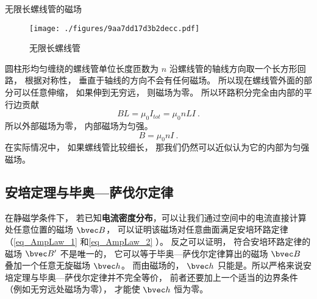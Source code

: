 \begin{example}{无限长螺线管的磁场}\label{ex_AmpLaw_2}
\begin{figure}[ht]
\centering
\texttt{[image: ./figures/9aa7dd17d3b2decc.pdf]}
\caption{无限长螺线管} \label{fig_AmpLaw_1}
\end{figure}
圆柱形均匀缠绕的螺线管单位长度匝数为 $n$ 沿螺线管的轴线方向取一个长方形回路， 根据对称性， 垂直于轴线的方向不会有任何磁场。 所以现在螺线管外面的部分可以任意伸缩， 如果伸到无穷远， 则磁场为零。 所以环路积分完全由内部的平行边贡献
\begin{equation}
BL = \mu_0 I_{tot} = \mu_0 nLI~.
\end{equation}
所以外部磁场为零， 内部磁场为匀强。
\begin{equation}
B = \mu_0 nI~.
\end{equation}
在实际情况中， 如果螺线管比较细长， 那我们仍然可以近似认为它的内部为匀强磁场。
\end{example}

\subsection{安培定理与毕奥—萨伐尔定律}

在静磁学条件下， 若已知\textbf{电流密度分布}，可以让我们通过空间中的电流直接计算处任意位置的磁场 $\bvec B$， 可以证明该磁场对任意曲面满足安培环路定律（\autoref{eq_AmpLaw_1} 和\autoref{eq_AmpLaw_2} ）。 反之可以证明， 符合安培环路定律的磁场 $\bvec B'$ 不是唯一的， 它可以等于毕奥—萨伐尔定律算出的磁场 $\bvec B$ 叠加一个任意无旋磁场 $\bvec h$。 而由磁场的， $\bvec h$ 只能是。所以严格来说安培定理与毕奥—萨伐尔定律并不完全等价， 前者还要加上一个适当的边界条件（例如无穷远处磁场为零）， 才能使 $\bvec h$ 恒为零。
